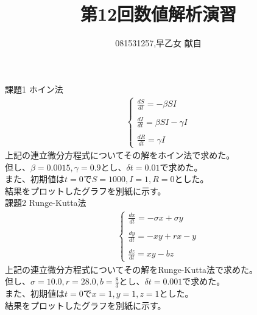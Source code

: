 \documentclass[]{jsarticle}
\title{第12回数値解析演習}
\author{081531257,早乙女 献自}
\date{}
\begin{document}
\maketitle
課題1 ホイン法\\
\begin{eqnarray}
\left\{
\begin{array}{l}
  \frac{dS}{dt} = -\beta SI\\\\
  \frac{dI}{dt} = \beta SI-\gamma I\\\\
  \frac{dR}{dt} = \gamma I 
\end{array}
\right.
\nonumber
\end{eqnarray}
上記の連立微分方程式についてその解をホイン法で求めた。\\
但し、$\beta = 0.0015,\gamma = 0.9$とし、$\delta t = 0.01$で求めた。\\
また、初期値は$t = 0$で$S = 1000,I = 1,R = 0$とした。\\
結果をプロットしたグラフを別紙に示す。\\
課題2 Runge-Kutta法\\
\begin{eqnarray}
\left\{
\begin{array}{l}
  \frac{dx}{dt} = -\sigma x + \sigma y\\\\
  \frac{dy}{dt} = -xy + rx - y\\\\
  \frac{dz}{dt} = xy - bz
\end{array}
\right.
\nonumber
\end{eqnarray}
上記の連立微分方程式についてその解をRunge-Kutta法で求めた。\\
但し、$\sigma = 10.0,r = 28.0,b = \frac{8}{3}$とし、$\delta t = 0.001$で求めた。\\
また、初期値は$t = 0$で$x =1,y = 1,z = 1$とした。\\
結果をプロットしたグラフを別紙に示す。\\
\end{document}
